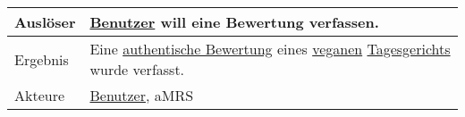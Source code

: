 \begin{table}[H]
\begin{tabularx}{\textwidth}{| l | X |}
        \hline
        Auslöser           & \hyperref[gls:nutzer]{Benutzer} will eine Bewertung verfassen.                                                                                                                                                                                                                                                                                                                                                                                                                                                                                                                                                                                                                                                                    \\
        \hline
        Ergebnis           & Eine \hyperref[gls:authentischeBewertung]{authentische Bewertung} eines \hyperref[gls:vegan]{veganen} \hyperref[gls:tagesgericht]{Tagesgerichts} wurde verfasst.                                                                                                                                                                                                                                                                                                                                                                                                                                                                                                                                                                  \\
        \hline
        Akteure            & \hyperref[gls:nutzer]{Benutzer}, \ac{aMRS}                                                                                                                                                                                                                                                                                                                                                                                                                                                                                                                                                                                                                                                                                        \\
        \hline
    \end{tabularx}
\end{table}



